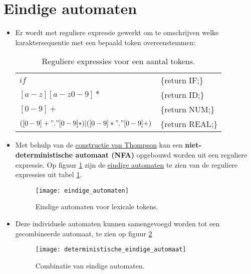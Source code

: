 \section{Eindige automaten}
	\begin{itemize}
	\item Er wordt met reguliere expressie gewerkt om te omschrijven welke karaktersequentie met een bepaald token overeenstemmen:
	
	\begin{table}[h]
		\centering
		\begin{tabular}{l l}
			$if$ & \{return IF;\} \\
			$[a-z][a-z0-9]*$ &\{return ID;\} \\
			$[0-9]+$ & \{return NUM;\} \\
			$([0-9]+"."[0-9]*)|([0-9]*"."[0-9]+)$ & \{return REAL;\} \\
		\end{tabular}
		\caption{Reguliere expressies voor een aantal tokens.}
		\label{table:reguliere_expressies_tokens}
	\end{table}

	\item Met behulp van de \underline{constructie van Thompson} kan een \textbf{niet-deterministische automaat (NFA)} opgebouwd worden uit een reguliere expressie. Op figuur \ref{fig:eindige_automaten} zijn de \underline{eindige automaten} te zien van de reguliere expressies uit tabel \ref{table:reguliere_expressies_tokens}.
	\begin{figure}
		\texttt{[image: eindige\_automaten]}
		\caption{Eindige automaten voor lexicale tokens.}
		\label{fig:eindige_automaten}
	\end{figure}

	\item Deze individuele automaten kunnen samengevoegd worden tot een gecombineerde automaat, te zien op figuur \ref{fig:deterministische_eindige_automaat}
		\begin{figure}
		\texttt{[image: deterministische\_eindige\_automaat]}
		\caption{Combinatie van eindige automaten.}
		\label{fig:deterministische_eindige_automaat}
	\end{figure}


\end{itemize}
